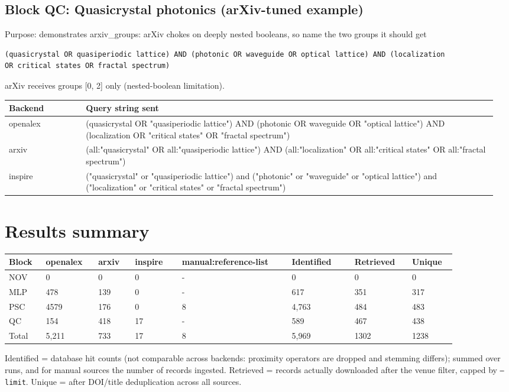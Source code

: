 \documentclass[10pt,a4paper]{article}
\begin{document}
\subsection*{Block QC: Quasicrystal photonics (arXiv-tuned example)}
Purpose: demonstrates arxiv\_groups: arXiv chokes on deeply nested booleans, so name the two groups it should get

\begin{Verbatim}[fontsize=\scriptsize]
(quasicrystal OR quasiperiodic lattice) AND (photonic OR waveguide OR optical lattice) AND (localization 
OR critical states OR fractal spectrum)
\end{Verbatim}
arXiv receives groups {[}0, 2{]} only (nested-boolean limitation).

{\scriptsize\begin{longtable}{p{0.151\linewidth}p{0.804\linewidth}}
\hline
\textbf{Backend} & \textbf{Query string sent} \\ \hline
\endhead
openalex & (quasicrystal OR "quasiperiodic lattice") AND (photonic OR waveguide OR "optical lattice") AND (localization OR "critical states" OR "fractal spectrum") \\
arxiv & (all:"quasicrystal" OR all:"quasiperiodic lattice") AND (all:"localization" OR all:"critical states" OR all:"fractal spectrum") \\
inspire & ("quasicrystal" or "quasiperiodic lattice") and ("photonic" or "waveguide" or "optical lattice") and ("localization" or "critical states" or "fractal spectrum") \\
\hline
\end{longtable}}
\section*{Results summary}
{\scriptsize\begin{longtable}{p{0.077\linewidth}p{0.103\linewidth}p{0.077\linewidth}p{0.094\linewidth}p{0.214\linewidth}p{0.120\linewidth}p{0.111\linewidth}p{0.085\linewidth}}
\hline
\textbf{Block} & \textbf{openalex} & \textbf{arxiv} & \textbf{inspire} & \textbf{manual:reference-list} & \textbf{Identified} & \textbf{Retrieved} & \textbf{Unique} \\ \hline
\endhead
NOV & 0 & 0 & 0 & - & 0 & 0 & 0 \\
MLP & 478 & 139 & 0 & - & 617 & 351 & 317 \\
PSC & 4579 & 176 & 0 & 8 & 4,763 & 484 & 483 \\
QC & 154 & 418 & 17 & - & 589 & 467 & 438 \\
Total & 5,211 & 733 & 17 & 8 & 5,969 & 1302 & 1238 \\
\hline
\end{longtable}}
Identified = database hit counts (not comparable across backends: proximity operators are dropped and stemming differs); summed over runs, and for manual sources the number of records ingested. Retrieved = records actually downloaded after the venue filter, capped by \texttt{--limit}. Unique = after DOI/title deduplication across all sources.
\end{document}
